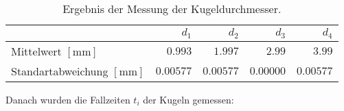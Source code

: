             \begin{table}[H]
                \centering
                \begin{tabular}{|l||r||r|r|r|}
                    \hline
                    & $d_{1}$ & $d_{2}$ & $d_{3}$ & $d_{4}$\\
                    \hline \hline
                    Mittelwert $[\mathrm{mm}]$ & $0.993$ & $1.997$ & $2.99$ & $3.99$\\
                    Standartabweichung $[\mathrm{mm}]$ & $0.00577$ & $0.00577$ & $0.00000$ & $0.00577$\\
                    \hline
                \end{tabular}
                \caption{Ergebnis der Messung der Kugeldurchmesser.}
                \label{tab:MesswerteDurchmesser}
            \end{table}

            Danach wurden die Fallzeiten $t_{i}$ der Kugeln gemessen:


